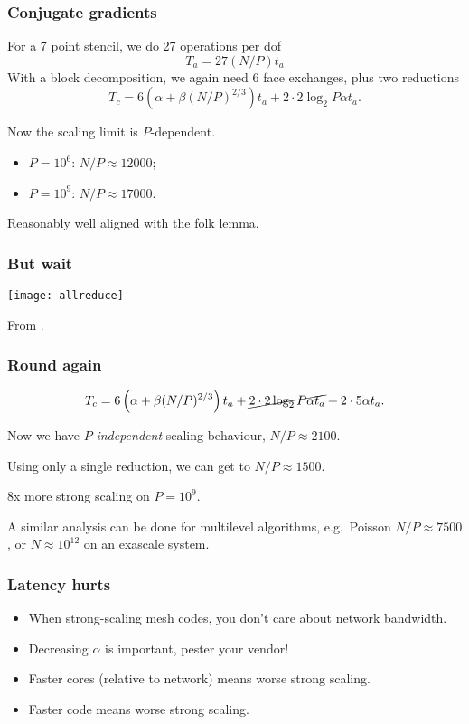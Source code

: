 \documentclass[presentation]{beamer}
\begin{document}
\begin{frame}
  \frametitle{Conjugate gradients}
  For a 7 point stencil, we do 27 operations per dof
  \begin{equation*}
    T_a = 27(N/P) t_a
  \end{equation*}
  With a block decomposition, we again need 6 face exchanges, plus
  two reductions
  \begin{equation*}
    T_c = 6 \left(\alpha + \beta (N/P)^{2/3}\right)t_a + 2 \cdot 2 \log_2 P \alpha t_a.
  \end{equation*}

  Now the scaling limit is $P$-dependent.

  \begin{itemize}
    \item $P=10^6$: $N/P \approx 12000$;
    \item $P=10^9$: $N/P \approx 17000$.
  \end{itemize}

  Reasonably well aligned with the folk lemma.
\end{frame}

\begin{frame}
  \frametitle{But wait}
  \begin{center}
    \texttt{[image: allreduce]}
  \end{center}
  From \textcite{Fischer:2015}.
\end{frame}

\begin{frame}
  \frametitle{Round again}
  \begin{equation*}
    T_c = 6 \left(\alpha + \beta (N/P)^{2/3}\right)t_a +
    \cancel{2\cdot 2 \log_2 P \alpha t_a} + 2 \cdot 5 \alpha t_a.
  \end{equation*}

  Now we have $P$-\emph{independent} scaling behaviour, $N/P \approx 2100$.

  Using only a single reduction, we can get to $N/P \approx
  1500$.

  \alert{8x} more strong scaling on $P=10^9$.

  A similar analysis can be done for multilevel algorithms,
  e.g.~Poisson $N/P \approx 7500$, or $N\approx 10^{12}$ on an exascale
  system.
\end{frame}

\begin{frame}
  \frametitle{Latency hurts}

  \begin{itemize}
  \item When strong-scaling mesh codes, you don't care about network
    bandwidth.
  \item Decreasing $\alpha$ is important, pester your vendor!
  \item Faster cores (relative to network) means worse strong scaling.
  \item Faster code means worse strong scaling.
  \end{itemize}
\end{frame}
\end{document}
